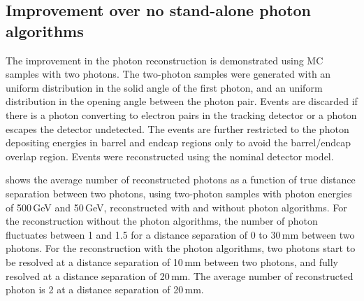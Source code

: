 \subsection{Improvement over no stand-alone photon algorithms}

The improvement in the photon reconstruction is demonstrated using  MC samples with two photons. The two-photon samples were generated with an uniform distribution in the solid angle of the first photon, and an uniform distribution in the opening angle  between the photon pair. Events are discarded if there is a photon converting to electron pairs in the tracking detector or a photon escapes the detector undetected. The events are further restricted to the photon depositing energies in barrel and endcap regions only to avoid the barrel/endcap overlap region. Events were reconstructed using the nominal \ILD detector model.


 shows the average number of reconstructed photons as a function of true distance separation between two photons,   using  two-photon samples
with photon energies of  500\,GeV and 50\,GeV,   reconstructed with and without photon algorithms. For the reconstruction without the photon algorithms, the number of photon fluctuates between 1 and 1.5 for a distance separation of 0 to 30\,mm between two photons.  For the reconstruction with the photon algorithms, two photons start to be resolved at a distance separation  of 10\,mm between two photons, and fully resolved at a  distance separation of 20\,mm.  The average number of reconstructed photon is 2 at a  distance separation of 20\,mm.


